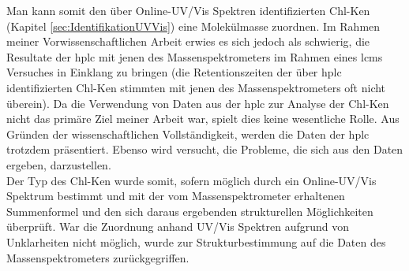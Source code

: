 Man kann somit den über Online-UV/Vis Spektren identifizierten \gls{Chl-K}en (Kapitel \ref{sec:IdentifikationUVVis}) eine Molekülmasse zuordnen. Im Rahmen meiner Vorwissenschaftlichen Arbeit erwies es sich jedoch als schwierig, die Resultate der \gls{hplc} mit jenen des Massenspektrometers im Rahmen eines \gls{lcms} Versuches in Einklang zu bringen (die Retentionszeiten der über \gls{hplc} identifizierten \gls{Chl-K}en stimmten mit jenen des Massenspektrometers oft nicht überein). Da die Verwendung von Daten aus der \gls{hplc} zur Analyse der \gls{Chl-K}en nicht das primäre Ziel meiner Arbeit war, spielt dies keine wesentliche Rolle. Aus Gründen der wissenschaftlichen Vollständigkeit, werden die Daten der \gls{hplc} trotzdem präsentiert. Ebenso wird versucht, die Probleme, die sich aus den Daten ergeben, darzustellen.\\

Der Typ des \gls{Chl-K}en wurde somit, sofern möglich durch ein Online-UV/Vis Spektrum bestimmt und mit der vom Massenspektrometer erhaltenen Summenformel und den sich daraus ergebenden strukturellen Möglichkeiten überprüft. War die Zuordnung anhand UV/Vis Spektren aufgrund von Unklarheiten nicht möglich, wurde zur Strukturbestimmung auf die Daten des Massenspektrometers zurückgegriffen.\\



